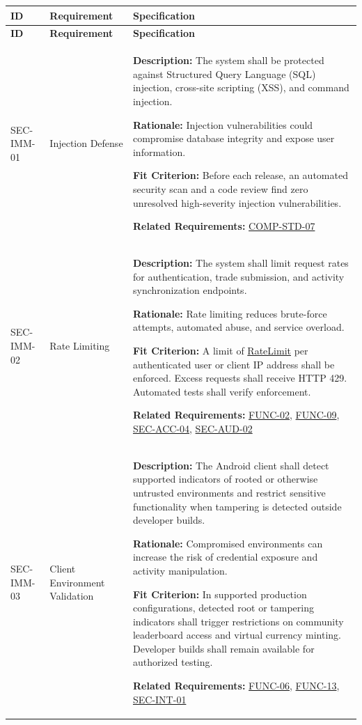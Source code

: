 \documentclass[12pt]{article}
\newcommand{\const}[1]{\hyperlink{const:#1}{\textsf{#1}}}
\newcommand{\acr}[3]{\phantomsection\label{acr:#1}#2 (#3)}
\begin{document}
\small
\setlength{\tabcolsep}{4pt}
\begin{xltabular}{\textwidth}{|p{2.6cm}|p{3.4cm}|X|}
\hline
\textbf{ID} & \textbf{Requirement} & \textbf{Specification} \\
\hline
\endfirsthead
\hline
\textbf{ID} & \textbf{Requirement} & \textbf{Specification} \\
\hline
\endhead

SEC-IMM-01\hypertarget{req:SEC-IMM-01}{} &
Injection Defense &
\textbf{Description:} The system shall be protected against \acr{SQL}{Structured Query Language}{SQL} injection, \acr{XSS}{cross-site scripting}{XSS}, and command injection.

\textbf{Rationale:} Injection vulnerabilities could compromise database integrity and expose user information.

\textbf{Fit Criterion:} Before each release, an automated security scan and a code review find zero unresolved high-severity injection vulnerabilities. 

\textbf{Related Requirements:} \hyperlink{req:COMP-STD-07}{COMP-STD-07}\\
\hline

SEC-IMM-02\hypertarget{req:SEC-IMM-02}{} &
Rate Limiting &
\textbf{Description:} The system shall limit request rates for authentication, trade submission, and activity synchronization endpoints.

\textbf{Rationale:} Rate limiting reduces brute-force attempts, automated abuse, and service overload.

\textbf{Fit Criterion:} A limit of \const{RateLimit} per authenticated user or client IP address shall be enforced. Excess requests shall receive HTTP 429. Automated tests shall verify enforcement. 

\textbf{Related Requirements:} \hyperlink{req:FUNC-02}{FUNC-02}, \hyperlink{req:FUNC-09}{FUNC-09}, \hyperlink{req:SEC-ACC-04}{SEC-ACC-04}, \hyperlink{req:SEC-AUD-02}{SEC-AUD-02}\\
\hline

SEC-IMM-03\hypertarget{req:SEC-IMM-03}{} &
Client Environment Validation &
\textbf{Description:} The Android client shall detect supported indicators of rooted or otherwise untrusted environments and restrict sensitive functionality when tampering is detected outside developer builds.

\textbf{Rationale:} Compromised environments can increase the risk of credential exposure and activity manipulation.

\textbf{Fit Criterion:} In supported production configurations, detected root or tampering indicators shall trigger restrictions on community leaderboard access and virtual currency minting. Developer builds shall remain available for authorized testing. 

\textbf{Related Requirements:} \hyperlink{req:FUNC-06}{FUNC-06}, \hyperlink{req:FUNC-13}{FUNC-13}, \hyperlink{req:SEC-INT-01}{SEC-INT-01}\\
\hline

\end{xltabular}
\end{document}
